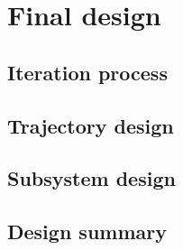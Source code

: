\section{Final design}\label{cha:finaldesign}

\subsection{Iteration process} \label{sec:iterationprocess}


\subsection{Trajectory design} \label{sec:trajectorydesign}


\subsection{Subsystem design} \label{sec:subsystemdesign}


\subsection{Design summary} \label{sec:designsummary}

